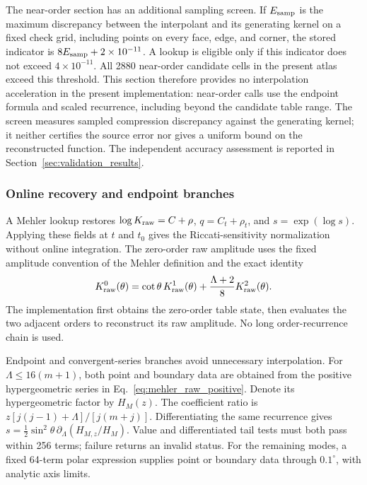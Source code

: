 ﻿\documentclass[11pt,a4paper]{article}
\begin{document}
The near-order section has an additional sampling screen. If $E_{\rm samp}$ is the maximum discrepancy between the interpolant and its generating kernel on a fixed check grid, including points on every face, edge, and corner, the stored indicator is $8E_{\rm samp}+2\times10^{-11}$. A lookup is eligible only if this indicator does not exceed $4\times10^{-11}$. All 2880 near-order candidate cells in the present atlas exceed this threshold. This section therefore provides no interpolation acceleration in the present implementation: near-order calls use the endpoint formula and scaled recurrence, including beyond the candidate table range. The screen measures sampled compression discrepancy against the generating kernel; it neither certifies the source error nor gives a uniform bound on the reconstructed function. The independent accuracy assessment is reported in Section~\ref{sec:validation_results}.

\subsubsection{Online recovery and endpoint branches}

A Mehler lookup restores $\log K_{\rm raw}=C+\rho$, $q=C_t+\rho_t$, and $s=\exp(\log s)$. Applying these fields at $t$ and $t_0$ gives the Riccati-sensitivity normalization without online integration. The zero-order raw amplitude uses the fixed amplitude convention of the Mehler definition and the exact identity
\begin{equation}
 K_{\rm raw}^{0}(\theta)=\cot\theta\,K_{\rm raw}^{1}(\theta)
       +\frac{\Lambda+2}{8}K_{\rm raw}^{2}(\theta).
 \label{eq:mehler-m0-reconstruction}
\end{equation}
The implementation first obtains the zero-order table state, then evaluates the two adjacent orders to reconstruct its raw amplitude. No long order-recurrence chain is used.

Endpoint and convergent-series branches avoid unnecessary interpolation. For $\Lambda\leq16(m+1)$, both point and boundary data are obtained from the positive hypergeometric series in Eq.~\eqref{eq:mehler_raw_positive}. Denote its hypergeometric factor by $H_M(z)$.
The coefficient ratio is $z[j(j-1)+\Lambda]/[j(m+j)]$. Differentiating the same recurrence gives $s=\tfrac12\sin^2\theta\,\partial_\Lambda(H_{M,z}/H_M)$. Value and differentiated tail tests must both pass within 256 terms; failure returns an invalid status. For the remaining modes, a fixed 64-term polar expression supplies point or boundary data through $0.1^\circ$, with analytic axis limits.
\end{document}
